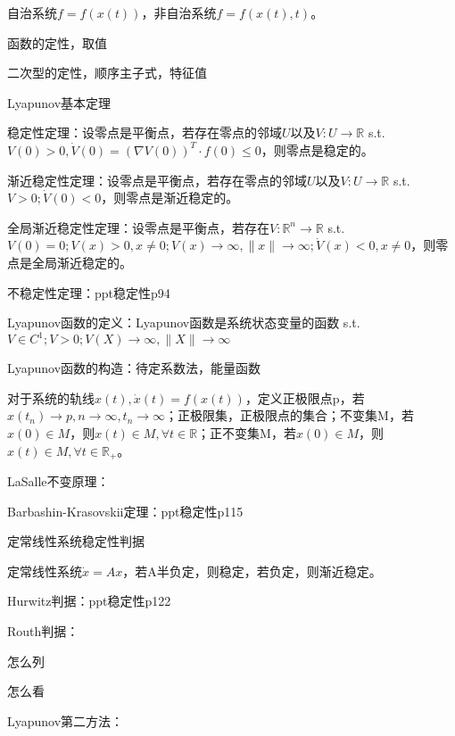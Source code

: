 自治系统$f = f(x(t))$，非自治系统$f = f(x(t), t)$。

函数的定性，取值

二次型的定性，顺序主子式，特征值

Lyapunov基本定理

稳定性定理：设零点是平衡点，若存在零点的邻域$U$以及$V: U \to \mathbb{R}$ s.t. $V(0) > 0, \dot V(0) = (\nabla V(0))^T \cdot f(0) \le 0$，则零点是稳定的。

渐近稳定性定理：设零点是平衡点，若存在零点的邻域$U$以及$V: U \to \mathbb{R}$ s.t. $V > 0; \dot V(0) < 0$，则零点是渐近稳定的。

全局渐近稳定性定理：设零点是平衡点，若存在$V: \mathbb{R}^n \to \mathbb{R}$ s.t. $V(0) = 0; V(x) > 0, x \neq 0; V(x) \to \infty, \|x\| \to \infty; \dot V(x) < 0, x \neq 0$，则零点是全局渐近稳定的。

不稳定性定理：ppt稳定性p94

Lyapunov函数的定义：Lyapunov函数是系统状态变量的函数 s.t. $V \in C^1; V > 0; V(X) \to \infty, \|X\| \to \infty$

Lyapunov函数的构造：待定系数法，能量函数

对于系统的轨线$x(t), \dot x(t) = f(x(t))$，定义正极限点p，若$x(t_n) \to p, n \to \infty, t_n \to \infty$；正极限集，正极限点的集合；不变集M，若$x(0) \in M$，则$x(t) \in M, \forall t \in \mathbb{R}$；正不变集M，若$x(0) \in M$，则$x(t) \in M, \forall t \in \mathbb{R}_+$。

LaSalle不变原理：

Barbashin-Krasovskii定理：ppt稳定性p115

定常线性系统稳定性判据

定常线性系统$\dot x = Ax$，若A半负定，则稳定，若负定，则渐近稳定。

Hurwitz判据：ppt稳定性p122

Routh判据：

怎么列

怎么看

Lyapunov第二方法：


